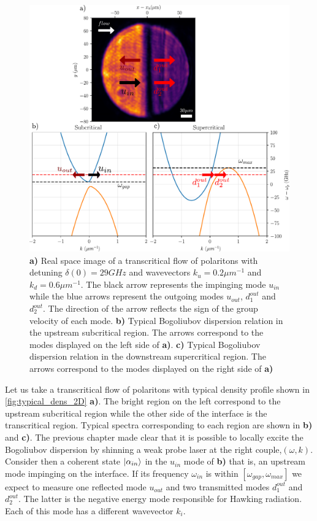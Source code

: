 \begin{figure}
    \centering
    \includegraphics[width=1\textwidth]{chap_stimulated_hawking/fig/typical_dens_2D.pdf}
    \caption{\textbf{a)} Real space image of a transcritical flow of polaritons with detuning $\delta(0)=29 GHz$ and wavevectors $k_u=0.2 \mu m^{-1}$ and $k_d=0.6\mu m^{-1}$. The black arrow represents the impinging mode $u_{in}$ while the blue arrows represent the outgoing modes $u_{out}$, $d_1^{out}$ and $d_2^{out}$. The direction
    of the arrow reflects the sign of the group velocity of each mode.
    \textbf{b)} Typical Bogoliubov dispersion relation in the upstream subcritical region. The arrows correspond to the modes displayed on the left side of \textbf{a)}. 
    \textbf{c)} Typical Bogoliubov dispersion relation in the downstream supercritical region. The arrows correspond to the modes displayed on the right side of \textbf{a)}}
    \label{fig:typical_dens_2D}
\end{figure}
Let us take a transcritical flow of polaritons with typical density profile shown in \autoref{fig:typical_dens_2D} \textbf{a)}. The bright
region on the left correspond to the upstream subcritical region while the other side of the interface is the transcritical region. Typical spectra corresponding to each region are shown in \textbf{b)} and \textbf{c)}.
The previous chapter made clear that it is possible to locally excite the Bogoliubov dispersion by shinning a weak probe laser at the right couple,$(\omega, k)$. Consider then a coherent state
$\ket{\alpha_{in}}$ in the $u_{in}$ mode of \textbf{b)} that is, an upstream mode impinging on the interface. If its frequency $\omega_{in}$ is within $[\omega_{gap}, \omega_{max}]$ we expect to measure one reflected mode $u_{out}$ and two transmitted modes $d_1^{out}$ and $d_2^{out}$. The latter is the negative
energy mode responsible for Hawking radiation. Each of this mode has a different wavevector $k_i$.

